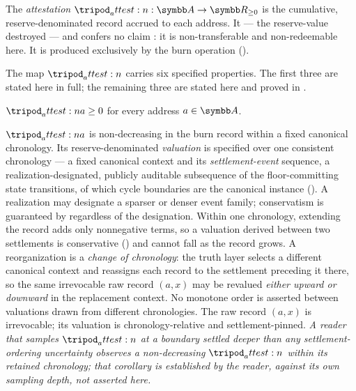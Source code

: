 \documentclass[../main.tex]{subfiles}
\begin{document}
\begin{definition}[Attestation]
    \label{def:interface:attestation}
    The \emph{attestation} $\attest{} : \addrspace \to \R_{\geq 0}$ is the cumulative,
    reserve-denominated record accrued to each address. It  ---
    the reserve-value destroyed --- and confers no claim \atthislayer{}: it is
    non-transferable and non-redeemable here. It is produced exclusively by the burn
    operation ().
\end{definition}

The map $\attest{}$ carries six specified properties. The first three are stated here in
full; the remaining three are stated here and proved in
.

\begin{postulate}
    \label{postc:interface:non-negativity}
    $\attest{a} \geq 0$ for every address $a \in \addrspace$.
\end{postulate}

\begin{postulate}[Monotonicity]
    \label{postc:interface:monotonicity}
    $\attest{a}$ is non-decreasing in the burn record within a fixed canonical
    chronology. Its reserve-denominated \emph{valuation} is specified over one
    consistent chronology --- a fixed canonical context and its \emph{settlement-event}
    sequence, a realization-designated, publicly auditable subsequence of the
    floor-committing state transitions, of which cycle boundaries are the canonical
    instance (). A realization may designate a sparser or
    denser event family; conservatism is guaranteed by
     regardless of the designation. Within one
    chronology, extending the record adds only nonnegative terms, so a valuation derived
    between two settlements is conservative ()
    and cannot fall as the record grows. A reorganization is a \emph{change of
    chronology}: the truth layer selects a different canonical context and reassigns each
    record to the settlement preceding it there, so the same irrevocable raw record
    $(a, x)$ may be revalued \emph{either upward or downward} in the replacement context.
    No monotone order is asserted between valuations drawn from different chronologies. The
    raw record $(a, x)$ is irrevocable; its valuation is chronology-relative and
    settlement-pinned. \emph{A reader that samples $\attest{}$ at a boundary settled deeper
    than any settlement-ordering uncertainty observes a non-decreasing $\attest{}$ within
    its retained chronology; that corollary is established by the reader, against its own
    sampling depth, not asserted here.}
\end{postulate}
\end{document}
